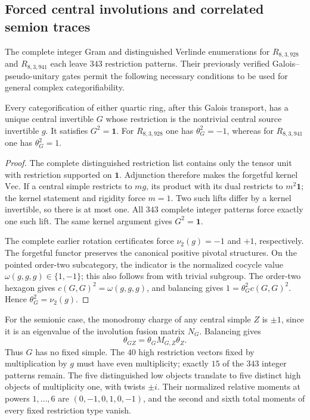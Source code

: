 \subsection{Forced central involutions and correlated semion traces}
\label{subsec:frontier-quartic-semion}

The complete integer Gram and distinguished Verlinde enumerations for
$R_{8,3,928}$ and $R_{8,3,941}$ each leave $343$ restriction patterns.
Their previously verified Galois--pseudo-unitary gates permit the following
necessary conditions to be used for general complex categorifiability.

\begin{proposition}
\label{prop:frontier-forced-quartic-involution}
Every categorification of either quartic ring, after this Galois transport,
has a unique central invertible $G$ whose restriction is the nontrivial
central source invertible $g$. It satisfies $G^2=\mathbf1$. For
$R_{8,3,928}$ one has $\theta_G^2=-1$, whereas for $R_{8,3,941}$ one has
$\theta_G^2=1$.
\end{proposition}
\begin{proof}
The complete distinguished restriction list contains only the tensor unit
with restriction supported on $\mathbf1$. Adjunction therefore makes the
forgetful kernel $\mathrm{Vec}$. If a central simple restricts to $m g$,
its product with its dual restricts to $m^2\mathbf1$; the kernel statement
and rigidity force $m=1$. Two such lifts differ by a kernel invertible,
so there is at most one. All $343$ complete integer patterns force exactly
one such lift. The same kernel argument gives $G^2=\mathbf1$.

The complete earlier rotation certificates force
$\nu_2(g)=-1$ and $+1$, respectively. The forgetful functor preserves the
canonical positive pivotal structures. On the pointed order-two
subcategory, the indicator is the normalized cocycle value
$\omega(g,g,g)\in\{1,-1\}$; this also follows from
\cite[Definition~2.2 and Proposition~4.1]{SchauenburgPointedFrontier}
with trivial subgroup. The order-two hexagon gives
$c(G,G)^2=\omega(g,g,g)$, and balancing gives
$1=\theta_G^2c(G,G)^2$. Hence $\theta_G^2=\nu_2(g)$.
\end{proof}

For the semionic case, the monodromy charge of any central simple $Z$
is $\pm1$, since it is an eigenvalue of the involution fusion matrix
$N_G$. Balancing gives
\[
 \theta_{GZ}=\theta_G M_{G,Z}\theta_Z.
\]
Thus $G$ has no fixed simple. The $40$ high restriction vectors fixed by
multiplication by $g$ must have even multiplicity; exactly $15$ of the
$343$ integer patterns remain. The five distinguished low objects
translate to five distinct high objects of multiplicity one, with twists
$\pm i$. Their normalized relative moments at powers $1,\ldots,6$ are
$(0,-1,0,1,0,-1)$, and the second and sixth total moments of every fixed
restriction type vanish.


